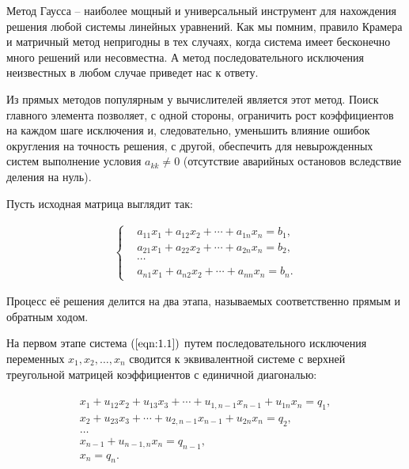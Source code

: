 \documentclass[a4paper]{article}
\begin{document}
Метод  Гаусса – наиболее мощный и универсальный инструмент для нахождения решения любой системы линейных уравнений. Как мы помним, правило Крамера и матричный метод непригодны в тех случаях, когда система имеет бесконечно много решений или несовместна. А метод последовательного исключения неизвестных в любом случае приведет нас к ответу.

Из прямых методов популярным у вычислителей является этот метод. Поиск главного элемента позволяет, с одной стороны, ограничить рост коэффициентов на каждом шаге исключения и, следовательно, уменьшить влияние ошибок округления на точность решения, с другой, обеспечить для невырожденных систем выполнение условия $a_{kk} \neq 0$ (отсутствие аварийных остановов вследствие деления на нуль).

Пусть исходная матрица выглядит так:

\begin{equation}
    \label{eqn:1.1}
    \begin{aligned}
    \begin{cases}
        & a_{11} x_{1}+a_{12} x_{2}+\cdots+a_{1 n} x_{n}=b_{1}, \\
        & a_{21} x_{1}+a_{22} x_{2}+\cdots+a_{2 n} x_{n}=b_{2}, \\
        & \cdots \\
        & a_{n 1} x_{1}+a_{n 2} x_{2}+\cdots+a_{n n} x_{n}=b_{n} .
    \end{cases}
    \end{aligned}
\end{equation}

Процесс её решения делится на два этапа, называемых соответственно прямым и обратным ходом.

На первом этапе система $(\ref{eqn:1.1})$ путем последовательного исключения переменных $x_{1}, x_{2}, \ldots, x_{n}$ сводится к эквивалентной системе с верхней треугольной матрицей коэффициентов с единичной диагональю:

\begin{equation}
    \label{eqn:1.2}
    \begin{aligned}
        \begin{array}{r}
            x_{1}+u_{12} x_{2}+u_{13} x_{3}+\cdots+u_{1, n-1} x_{n-1}+u_{1 n} x_{n}=q_{1}, \\
            x_{2}+u_{23} x_{3}+\cdots+u_{2, n-1} x_{n-1}+u_{2 n} x_{n}=q_{2}, \\
            \ldots \\
            x_{n-1}+u_{n-1, n} x_{n}=q_{n-1}, \\
            x_{n}=q_{n} .
        \end{array}
    \end{aligned}
\end{equation}
\end{document}
